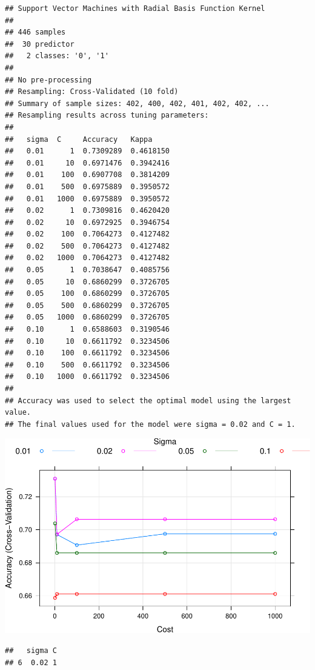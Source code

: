 \documentclass[
]{article}
\begin{document}
\begin{verbatim}
## Support Vector Machines with Radial Basis Function Kernel 
## 
## 446 samples
##  30 predictor
##   2 classes: '0', '1' 
## 
## No pre-processing
## Resampling: Cross-Validated (10 fold) 
## Summary of sample sizes: 402, 400, 402, 401, 402, 402, ... 
## Resampling results across tuning parameters:
## 
##   sigma  C     Accuracy   Kappa    
##   0.01      1  0.7309289  0.4618150
##   0.01     10  0.6971476  0.3942416
##   0.01    100  0.6907708  0.3814209
##   0.01    500  0.6975889  0.3950572
##   0.01   1000  0.6975889  0.3950572
##   0.02      1  0.7309816  0.4620420
##   0.02     10  0.6972925  0.3946754
##   0.02    100  0.7064273  0.4127482
##   0.02    500  0.7064273  0.4127482
##   0.02   1000  0.7064273  0.4127482
##   0.05      1  0.7038647  0.4085756
##   0.05     10  0.6860299  0.3726705
##   0.05    100  0.6860299  0.3726705
##   0.05    500  0.6860299  0.3726705
##   0.05   1000  0.6860299  0.3726705
##   0.10      1  0.6588603  0.3190546
##   0.10     10  0.6611792  0.3234506
##   0.10    100  0.6611792  0.3234506
##   0.10    500  0.6611792  0.3234506
##   0.10   1000  0.6611792  0.3234506
## 
## Accuracy was used to select the optimal model using the largest value.
## The final values used for the model were sigma = 0.02 and C = 1.
\end{verbatim}

\begin{center}\includegraphics{report_files/figure-latex/unnamed-chunk-58-1} \end{center}

\begin{verbatim}
##   sigma C
## 6  0.02 1
\end{verbatim}
\end{document}
